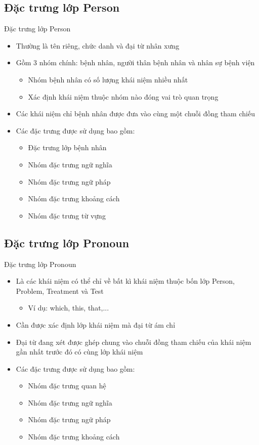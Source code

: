\subsection{Đặc trưng lớp Person}
\begin{frame}{Đặc trưng lớp Person}
\putlogo
\begin{itemize}
	\item Thường là tên riêng, chức danh và đại từ nhân xưng
	\item Gồm 3 nhóm chính: bệnh nhân, người thân bệnh nhân và nhân sự bệnh viện
	\begin{itemize}
		\item Nhóm bệnh nhân có số lượng khái niệm nhiều nhất
		\item Xác định khái niệm thuộc nhóm nào đóng vai trò quan trọng
	\end{itemize}
	\item Các khái niệm chỉ bệnh nhân được đưa vào cùng một chuỗi đồng tham chiếu
	\item Các đặc trưng được sử dụng bao gồm:
	\begin{itemize}
		\item Đặc trưng lớp bệnh nhân
		\item Nhóm đặc trưng ngữ nghĩa
		\item Nhóm đặc trưng ngữ pháp
		\item Nhóm đặc trưng khoảng cách
		\item Nhóm đặc trưng từ vựng
	\end{itemize}
\end{itemize}
\end{frame}

\subsection{Đặc trưng lớp Pronoun}
\begin{frame}{Đặc trưng lớp Pronoun}
\putlogo
\begin{itemize}
	\item Là các khái niệm có thể chỉ về bất kì khái niệm thuộc bốn lớp Person, Problem, Treatment và Test
	\begin{itemize}
		\item Ví dụ: which, this, that,...
	\end{itemize}
	\item Cần được xác định lớp khái niệm mà đại từ ám chỉ
	\item Đại từ đang xét được ghép chung vào chuỗi đồng tham chiếu của khái niệm gần nhất trước đó có cùng lớp khái niệm
	\item Các đặc trưng được sử dụng bao gồm:
	\begin{itemize}
		\item Nhóm đặc trưng quan hệ
		\item Nhóm đặc trưng ngữ nghĩa
		\item Nhóm đặc trưng ngữ pháp
		\item Nhóm đặc trưng khoảng cách
	\end{itemize}
\end{itemize}
\end{frame}

